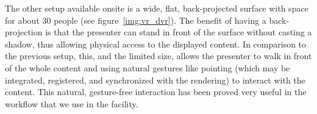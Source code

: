 \documentclass[review,journal]{vgtc}         %
\begin{document}
The other setup available onsite is a wide, flat, back-projected surface with space for about 30 people (see figure~\ref{img:vr_dvr}).
The benefit of having a back-projection is that the presenter can stand in front of the surface without casting a shadow, thus allowing physical access to the displayed content.
In comparison to the previous setup, this, and the limited size, allows the presenter to walk in front of the whole content and using natural gestures like pointing (which may be integrated, registered, and synchronized with the rendering) to interact with the content.
This natural, gesture-free interaction has been proved very useful in the workflow that we use in the facility.







\end{document}
